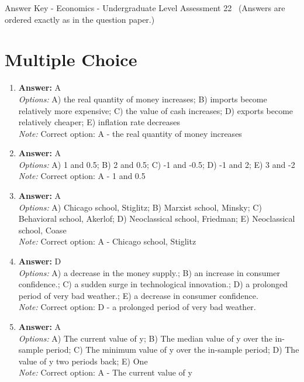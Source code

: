 \documentclass[12pt]{article}
\begin{document}
\begin{center}
Answer Key - Economics - Undergraduate Level Assessment 22 \
\small (Answers are ordered exactly as in the question paper.)
\end{center}

\section*{Multiple Choice}
\begin{enumerate}[label=\arabic*.]
\item \textbf{Answer:} A
\\ \textit{Options:} A) the real quantity of money increases; B) imports become relatively more expensive; C) the value of cash increases; D) exports become relatively cheaper; E) inflation rate decreases
\\ \textit{Note:} Correct option: A - the real quantity of money increases
\item \textbf{Answer:} A
\\ \textit{Options:} A) 1 and 0.5; B) 2 and 0.5; C) -1 and -0.5; D) -1 and 2; E) 3 and -2
\\ \textit{Note:} Correct option: A - 1 and 0.5
\item \textbf{Answer:} A
\\ \textit{Options:} A) Chicago school, Stiglitz; B) Marxist school, Minsky; C) Behavioral school, Akerlof; D) Neoclassical school, Friedman; E) Neoclassical school, Coase
\\ \textit{Note:} Correct option: A - Chicago school, Stiglitz
\item \textbf{Answer:} D
\\ \textit{Options:} A) a decrease in the money supply.; B) an increase in consumer confidence.; C) a sudden surge in technological innovation.; D) a prolonged period of very bad weather.; E) a decrease in consumer confidence.
\\ \textit{Note:} Correct option: D - a prolonged period of very bad weather.
\item \textbf{Answer:} A
\\ \textit{Options:} A) The current value of y; B) The median value of y over the in-sample period; C) The minimum value of y over the in-sample period; D) The value of y two periods back; E) One
\\ \textit{Note:} Correct option: A - The current value of y
\end{enumerate}
\end{document}
